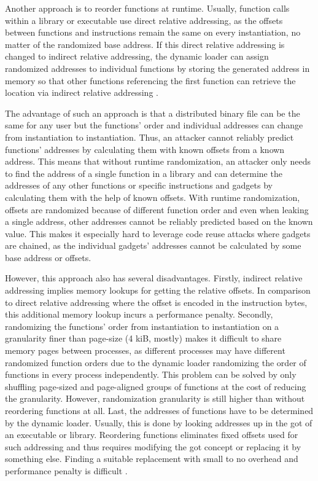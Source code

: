 Another approach is to reorder functions at runtime.
Usually, function calls within a library or executable use direct relative addressing, as the offsets between functions and instructions remain the same on every instantiation, no matter of the randomized base address.
If this direct relative addressing is changed to indirect relative addressing, the dynamic loader can assign randomized addresses to individual functions by storing the generated address in memory so that other functions referencing the first function can retrieve the location via indirect relative addressing \cite[304\psq]{Shacham2004}.

The advantage of such an approach is that a distributed binary file can be the same for any user but the functions' order and individual addresses can change from instantiation to instantiation.
Thus, an attacker cannot reliably predict functions' addresses by calculating them with known offsets from a known address.
This means that without runtime randomization, an attacker only needs to find the address of a single function in a library and can determine the addresses of any other functions or specific instructions and gadgets by calculating them with the help of known offsets.
With runtime randomization, offsets are randomized because of different function order and even when leaking a single address, other addresses cannot be reliably predicted based on the known value.
This makes it especially hard to leverage code reuse attacks where gadgets are chained, as the individual gadgets' addresses cannot be calculated by some base address or offsets.

However, this approach also has several disadvantages.
Firstly, indirect relative addressing implies memory lookups for getting the relative offsets.
In comparison to direct relative addressing where the offset is encoded in the instruction bytes, this additional memory lookup incurs a performance penalty.
Secondly, randomizing the functions' order from instantiation to instantiation on a granularity finer than page-size (4 kiB, mostly) makes it difficult to share memory pages between processes, as different processes may have different randomized function orders due to the dynamic loader randomizing the order of functions in every process independently.
This problem can be solved by only shuffling page-sized and page-aligned groups of functions at the cost of reducing the granularity.
However, randomization granularity is still higher than without reordering functions at all.
Last, the addresses of functions have to be determined by the dynamic loader.
Usually, this is done by looking addresses up in the \gls{got} of an executable or library.
Reordering functions eliminates fixed offsets used for such addressing and thus requires modifying the \gls{got} concept or replacing it by something else.
Finding a suitable replacement with small to no overhead and performance penalty is difficult \cite[304\psq]{Shacham2004}.

